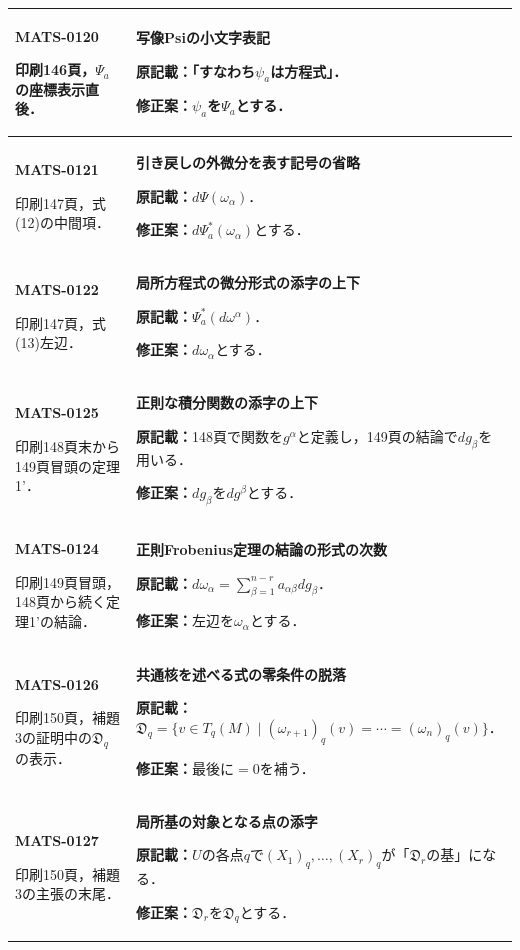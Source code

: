 \documentclass[a4paper,10pt]{ltjsarticle}
\begin{document}
\begin{longtable}{@{}>{\raggedright\arraybackslash}p{.19\linewidth}>{\raggedright\arraybackslash}p{.77\linewidth}@{}}
\hline
\hypertarget{MATS-0120}{}\textbf{MATS-0120}\par 印刷146頁，$\Psi_a$の座標表示直後． & \textbf{写像Psiの小文字表記}\par\textbf{原記載：}「すなわち$\psi_a$は方程式」．\par\textbf{修正案：}$\psi_a$を$\Psi_a$とする． \\[3pt]
\hline
\hypertarget{MATS-0121}{}\textbf{MATS-0121}\par 印刷147頁，式(12)の中間項． & \textbf{引き戻しの外微分を表す記号の省略}\par\textbf{原記載：}$d\Psi(\omega_\alpha)$．\par\textbf{修正案：}$d\Psi_a^*(\omega_\alpha)$とする． \\[3pt]
\hline
\hypertarget{MATS-0122}{}\textbf{MATS-0122}\par 印刷147頁，式(13)左辺． & \textbf{局所方程式の微分形式の添字の上下}\par\textbf{原記載：}$\Psi_a^*(d\omega^\alpha)$．\par\textbf{修正案：}$d\omega_\alpha$とする． \\[3pt]
\hline
\hypertarget{MATS-0125}{}\textbf{MATS-0125}\par 印刷148頁末から149頁冒頭の定理1'． & \textbf{正則な積分関数の添字の上下}\par\textbf{原記載：}148頁で関数を$g^\alpha$と定義し，149頁の結論で$dg_\beta$を用いる．\par\textbf{修正案：}$dg_\beta$を$dg^\beta$とする． \\[3pt]
\hline
\hypertarget{MATS-0124}{}\textbf{MATS-0124}\par 印刷149頁冒頭，148頁から続く定理1'の結論． & \textbf{正則Frobenius定理の結論の形式の次数}\par\textbf{原記載：}$d\omega_\alpha=\sum_{\beta=1}^{n-r}a_{\alpha\beta}dg_\beta$．\par\textbf{修正案：}左辺を$\omega_\alpha$とする． \\[3pt]
\hline
\hypertarget{MATS-0126}{}\textbf{MATS-0126}\par 印刷150頁，補題3の証明中の$\mathfrak D_q$の表示． & \textbf{共通核を述べる式の零条件の脱落}\par\textbf{原記載：}$\mathfrak D_q=\{v\in T_q(M)\mid(\omega_{r+1})_q(v)=\cdots=(\omega_n)_q(v)\}$．\par\textbf{修正案：}最後に$=0$を補う． \\[3pt]
\hline
\hypertarget{MATS-0127}{}\textbf{MATS-0127}\par 印刷150頁，補題3の主張の末尾． & \textbf{局所基の対象となる点の添字}\par\textbf{原記載：}$U$の各点$q$で$(X_1)_q,\ldots,(X_r)_q$が「$\mathfrak D_r$の基」になる．\par\textbf{修正案：}$\mathfrak D_r$を$\mathfrak D_q$とする． \\[3pt]

\end{longtable}
\end{document}
